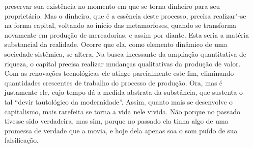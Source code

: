 preservar sua existência no momento em que se torna dinheiro para seu
proprietário. Mas o dinheiro, que é a essência deste processo, precisa
realizar"-se na forma capital, voltando ao início das metamorfoses,
quando se transforma novamente em produção de mercadorias, e assim por
diante. Esta seria a matéria substancial da realidade. Ocorre que ela,
como elemento dinâmico de uma sociedade sistêmica, se altera. Na busca
incessante da ampliação quantitativa de riqueza, o capital precisa
realizar mudanças qualitativas da produção de valor. Com as renovações
tecnológicas ele atinge parcialmente este fim, eliminando quantidades
crescentes de trabalho do processo de produção. Ora, mas é justamente
ele, cujo tempo dá a medida abstrata da substância, que sustenta o tal
``devir tautológico da modernidade''. Assim, quanto mais se desenvolve o
capitalismo, mais rarefeita se torna a vida nele vivida. Não porque no
passado tivesse sido verdadeira, mas sim, porque no passado ela tinha
algo de uma promessa de verdade que a movia, e hoje dela apenas soa o
som puído de sua falsificação.

